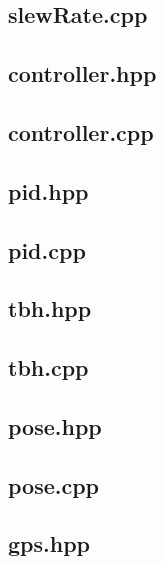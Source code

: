 \subsection{slewRate.cpp}

\subsection{controller.hpp}

\subsection{controller.cpp}

\subsection{pid.hpp}

\subsection{pid.cpp}

\subsection{tbh.hpp}

\subsection{tbh.cpp}

\subsection{pose.hpp}

\subsection{pose.cpp}

\subsection{gps.hpp}

